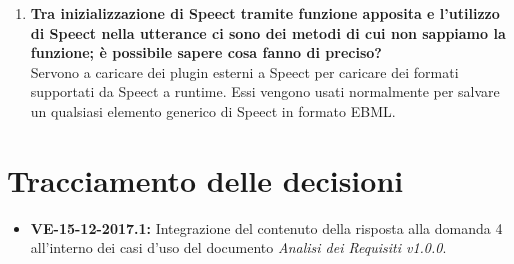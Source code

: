\documentclass[openany,12pt,a4paper]{article}
\begin{document}
\begin{enumerate}
	\item \textbf{Tra inizializzazione di Speect tramite funzione apposita e l'utilizzo di Speect nella utterance ci sono dei metodi di cui non sappiamo la funzione; è possibile sapere cosa fanno di preciso?}\\ Servono a caricare dei plugin esterni a Speect per caricare dei formati supportati da Speect a runtime. Essi vengono usati normalmente per salvare un qualsiasi elemento generico di Speect in formato EBML.

	\end{enumerate}
	
	\section{Tracciamento delle decisioni}
	
	\begin{itemize}
	    \item \textbf{VE-15-12-2017.1:} Integrazione del contenuto della risposta alla domanda 4 all'interno dei casi d'uso del documento \textit{Analisi dei Requisiti v1.0.0}.
	\end{itemize}
	
	
\end{document}

